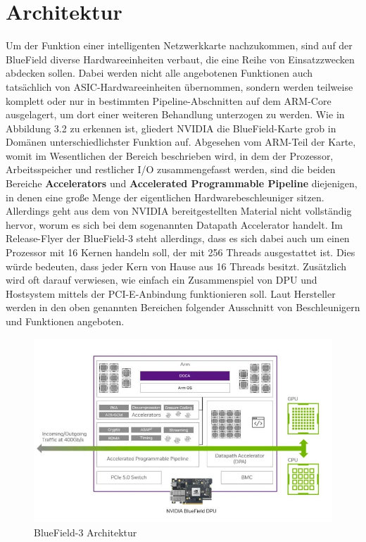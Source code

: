 \section{Architektur}
Um der Funktion einer intelligenten Netzwerkkarte nachzukommen, sind auf der BlueField diverse Hardwareeinheiten verbaut, die eine Reihe von Einsatzzwecken abdecken sollen. Dabei werden nicht alle angebotenen Funktionen auch tatsächlich von ASIC-Hardwareeinheiten übernommen, sondern werden teilweise komplett oder nur in bestimmten Pipeline-Abschnitten auf dem ARM-Core ausgelagert, um dort einer weiteren Behandlung unterzogen zu werden. Wie in Abbildung 3.2 zu erkennen ist, gliedert NVIDIA die BlueField-Karte grob in Domänen unterschiedlichster Funktion auf. Abgesehen vom ARM-Teil der Karte, womit im Wesentlichen der Bereich beschrieben wird, in dem der Prozessor, Arbeitsspeicher und restlicher I/O zusammengefasst werden, sind die beiden Bereiche \textbf{Accelerators} und \textbf{Accelerated Programmable Pipeline} diejenigen, in denen eine große Menge der eigentlichen Hardwarebeschleuniger sitzen. Allerdings geht aus dem von NVIDIA bereitgestellten Material nicht vollständig hervor, worum es sich bei dem sogenannten Datapath Accelerator handelt. \cite{nvidia_bluefield_dpu}  Im Release-Flyer der BlueField-3 steht allerdings, dass es sich dabei auch um einen Prozessor mit 16 Kernen handeln soll, der mit 256 Threads ausgestattet ist. Dies würde bedeuten, dass jeder Kern von Hause aus 16 Threads besitzt. Zusätzlich wird oft darauf verwiesen, wie einfach ein Zusammenspiel von DPU und Hostsystem mittels der PCI-E-Anbindung funktionieren soll. Laut Hersteller werden in den oben genannten Bereichen folgender Ausschnitt von Beschleunigern und Funktionen angeboten. \cite{nvidia_bluefield_dpu} 
\begin{figure}
    \centering
    \includegraphics[width=1\linewidth]{images/nvda-bluefield-dpu.png}
    \caption{BlueField-3 Architektur}
    \label{fig:enter-label}
\end{figure}
